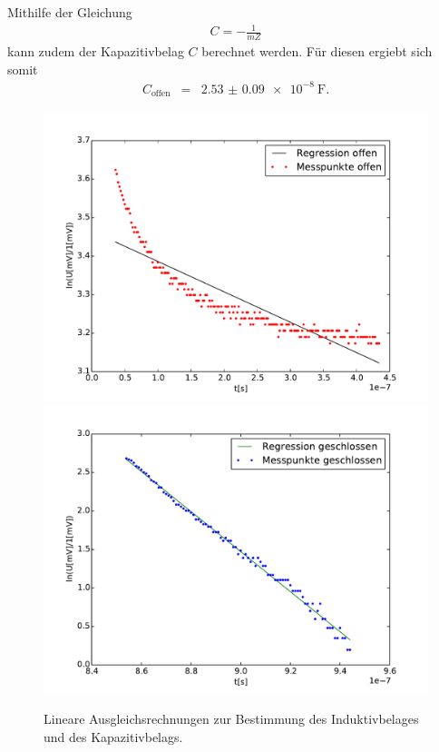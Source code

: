Mithilfe der Gleichung
\begin{eqnarray*}
	C = -\frac{1}{mZ}
\end{eqnarray*}
kann zudem der Kapazitivbelag $C$ berechnet werden.
Für diesen ergiebt sich somit
\begin{eqnarray*}
	C_\text{offen} &=& \SI{2.53(9)e-8}{\farad}.
\end{eqnarray*}

\begin{figure}
	\centering
	\includegraphics[width = 14cm]{data/c/Regression1.pdf}
	\includegraphics[width = 14cm]{data/c/Regression2.pdf}
	\caption{Lineare Ausgleichsrechnungen zur Bestimmung des Induktivbelages und des Kapazitivbelags.}
	\label{fig_fit1}
\end{figure}
